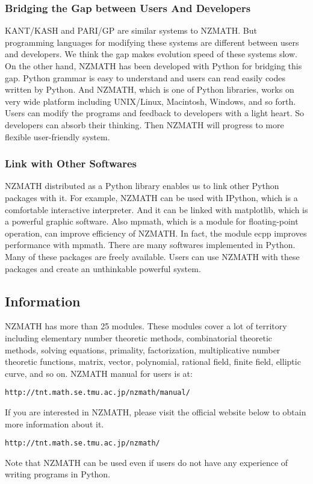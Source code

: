 \subsubsection{Bridging the Gap between Users And Developers}
%
KANT/KASH\cite{KANT} and PARI/GP\cite{PARI} are similar systems to NZMATH.
But programming languages for modifying these systems are 
different between users and developers.
We think the gap makes evolution speed of these systems slow.
On the other hand, NZMATH has been developed with Python for bridging this gap. 
Python grammar is easy to understand 
and users can read easily codes written by Python.
And NZMATH, which is one of Python libraries, works on very wide platform 
including UNIX/Linux, Macintosh, Windows, and so forth.
Users can modify the programs and feedback to developers with a light heart.
So developers can absorb their thinking.
Then NZMATH will progress to more flexible user-friendly system.
%
\subsubsection{Link with Other Softwares}
%
NZMATH distributed as a Python library 
enables us to link other Python packages with it.
For example, NZMATH can be used with IPython\cite{IPython}, 
which is a comfortable interactive interpreter.
And it can be linked with matplotlib\cite{matplotlib},
which is a powerful graphic software.
Also mpmath\cite{mpmath}, which is a module for floating-point operation, 
can improve efficiency of NZMATH.
In fact, the module ecpp improves performance with mpmath.
There are many softwares implemented in Python.
Many of these packages are freely available.
Users can use NZMATH with these packages 
and create an unthinkable powerful system.
%
\subsection{Information}
  NZMATH has more than 25 modules.
These modules cover a lot of territory including
elementary number theoretic methods, combinatorial theoretic methods, 
solving equations, primality, factorization, 
multiplicative number theoretic functions, 
matrix, vector, polynomial, rational field, finite field, 
elliptic curve, and so on.
NZMATH manual for users is at:
\begin{verbatim}
http://tnt.math.se.tmu.ac.jp/nzmath/manual/
\end{verbatim}
If you are interested in NZMATH, please visit the official website 
below to obtain more information about it.
\begin{verbatim}
http://tnt.math.se.tmu.ac.jp/nzmath/
\end{verbatim}
Note that NZMATH can be used even if users do not have any experience of
writing programs in Python.
%

